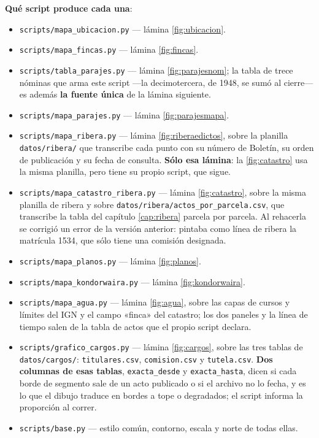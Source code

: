 \textbf{Qué script produce cada una}:

\begin{itemize}[leftmargin=*,nosep]
\item \texttt{scripts/mapa\_ubicacion.py} --- lámina \ref{fig:ubicacion}.
\item \texttt{scripts/mapa\_fincas.py} --- lámina \ref{fig:fincas}.
\item \texttt{scripts/tabla\_parajes.py} --- lámina \ref{fig:parajesnom}; la tabla de trece
nóminas que arma este script ---la decimotercera, de 1948, se sumó al cierre--- es además \textbf{la fuente única} de la lámina siguiente.
\item \texttt{scripts/mapa\_parajes.py} --- lámina \ref{fig:parajesmapa}.
\item \texttt{scripts/mapa\_ribera.py} --- lámina \ref{fig:riberaedictos}, sobre la planilla
\texttt{datos/ribera/} que transcribe cada punto con su número de Boletín, su orden de
publicación y su fecha de consulta. \textbf{Sólo esa lámina}: la \ref{fig:catastro} usa la misma planilla, pero tiene su propio script,
que sigue.
\item \texttt{scripts/mapa\_catastro\_ribera.py} --- lámina \ref{fig:catastro}, sobre la misma
planilla de ribera y sobre \texttt{datos/ribera/actos\_por\_parcela.csv}, que transcribe la tabla del
capítulo \ref{cap:ribera} parcela por parcela. Al rehacerla se corrigió un error de la versión
anterior: pintaba como línea de ribera la matrícula 1534, que sólo tiene una comisión designada.
\item \texttt{scripts/mapa\_planos.py} --- lámina \ref{fig:planos}.
\item \texttt{scripts/mapa\_kondorwaira.py} --- lámina \ref{fig:kondorwaira}.
\item \texttt{scripts/mapa\_agua.py} --- lámina \ref{fig:agua}, sobre las capas de cursos y límites del IGN y el campo «finca» del catastro; los dos paneles y la línea de tiempo salen de la tabla de actos que el propio script declara.
\item \texttt{scripts/grafico\_cargos.py} --- lámina \ref{fig:cargos}, sobre las tres tablas de
\texttt{datos/cargos/}: \texttt{titulares.csv}, \texttt{comision.csv} y \texttt{tutela.csv}.
\textbf{Dos columnas de esas tablas}, \texttt{exacta\_desde} y \texttt{exacta\_hasta}, dicen si
cada borde de segmento sale de un acto publicado o si el archivo no lo fecha, y es lo que el
dibujo traduce en bordes a tope o degradados; el script informa la proporción al correr.
\item \texttt{scripts/base.py} --- estilo común, contorno, escala y norte de todas ellas.

\end{itemize}
